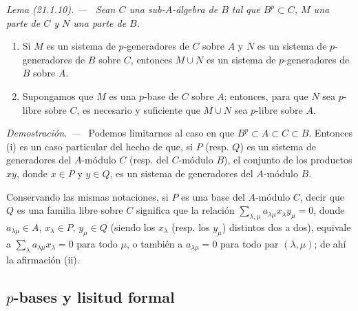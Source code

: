 \documentclass[10pt,oneside]{book}
\makeatletter
\newcommand{\setmanualcurrentlabel}[1]{\def\@currentlabel{#1}}
\newcommand{\oldpage}[2][]{%
  \setcounter{footnote}{0}%
  \marginpar{\scriptsize\textbf{#1}~|~#2}\ignorespaces}
\newenvironment{lemma}[1][]{%
  \setmanualcurrentlabel{#1}\par\medskip\noindent\itshape Lema (#1). ---\ }{\par}
\newenvironment{proof}{%
  \par\medskip\noindent\textit{Demostración. ---\ }}{\par}
\makeatother
\begin{document}
\oldpage[0\textsubscript{IV-1}]{157}
\begin{lemma}[21.1.10]
\label{0.21.1.10-es}
Sean $C$ una sub-$A$-álgebra de $B$ tal que $B^p\subset C$, $M$ una
parte de $C$ y $N$ una parte de $B$.
\begin{enumerate}
  \item[\textup{(i)}] Si $M$ es un sistema de $p$-generadores de $C$ sobre $A$ y $N$
  es un sistema de $p$-generadores de $B$ sobre $C$, entonces $M\cup N$ es un
  sistema de $p$-generadores de $B$ sobre $A$.
  \item[\textup{(ii)}] Supongamos que $M$ es una $p$-base de $C$ sobre $A$; entonces,
  para que $N$ sea $p$-libre sobre $C$, es necesario y suficiente que $M\cup N$
  sea $p$-libre sobre $A$.
\end{enumerate}
\end{lemma}

\begin{proof}
Podemos limitarnos al caso en que $B^p\subset A\subset C\subset B$. Entonces
(i) es un caso particular del hecho de que, si $P$ (resp. $Q$) es un sistema
de generadores del $A$-módulo $C$ (resp. del $C$-módulo $B$), el conjunto de
los productos $xy$, donde $x\in P$ y $y\in Q$, es un sistema de generadores
del $A$-módulo $B$.

Conservando las mismas notaciones, si $P$ es una base del $A$-módulo $C$,
decir que $Q$ es una familia libre sobre $C$ significa que la relación
$\sum_{\lambda,\mu}a_{\lambda\mu}x_\lambda y_\mu=0$, donde
$a_{\lambda\mu}\in A$, $x_\lambda\in P$, $y_\mu\in Q$ (siendo los
$x_\lambda$ (resp. los $y_\mu$) distintos dos a dos), equivale a
$\sum_\lambda a_{\lambda\mu}x_\lambda=0$ para todo $\mu$, o también a
$a_{\lambda\mu}=0$ para todo par $(\lambda,\mu)$; de ahí la
afirmación (ii).
\end{proof}

\subsection{$p$-bases y lisitud formal}
\label{0.21.2-es}
\end{document}
